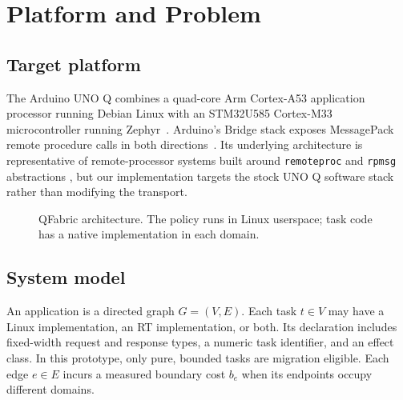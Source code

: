 \documentclass[conference]{IEEEtran}
\newcommand{\system}{QFabric\xspace}
\begin{document}
\section{Platform and Problem}
\subsection{Target platform}
The Arduino UNO Q combines a quad-core Arm Cortex-A53 application processor
running Debian Linux with an STM32U585 Cortex-M33 microcontroller running
Zephyr~\cite{arduinoUnoQ}. Arduino's Bridge stack exposes MessagePack remote
procedure calls in both directions~\cite{arduinoRouterBridge}. Its underlying
architecture is representative of remote-processor systems built around
\texttt{remoteproc} and \texttt{rpmsg} abstractions
\cite{linuxRemoteproc,linuxRpmsg}, but our implementation targets the stock UNO
Q software stack rather than modifying the transport.

\begin{figure}[t]
\centering
{}
\caption{\system architecture. The policy runs in Linux userspace; task code
has a native implementation in each domain.}
\label{fig:architecture}
\end{figure}

\subsection{System model}
An application is a directed graph $G=(V,E)$. Each task $t\in V$ may have a
Linux implementation, an RT implementation, or both. Its declaration includes
fixed-width request and response types, a numeric task identifier, and an
effect class. In this prototype, only pure, bounded tasks are migration
eligible. Each edge $e\in E$ incurs a measured boundary cost $b_e$ when its
endpoints occupy different domains.
\end{document}
